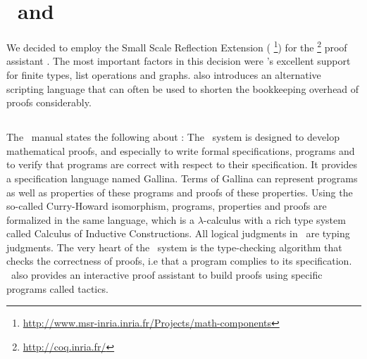 \chapter{\coq\ and \ssreflect}
\label{chap:coq}


We decided to employ the Small Scale Reflection Extension \cite{gonthier:inria-00258384} (\textbf{\ssreflect}%
\footnote{\url{http://www.msr-inria.inria.fr/Projects/math-components}})
for the \textbf{\coq}%
\footnote{\url{http://coq.inria.fr/}}
proof assistant \cite{Coq:manual}. 
The most important factors in this decision were \ssreflect's excellent support for finite types, list operations and graphs. \ssreflect{} also introduces an alternative scripting language that can often be used to shorten the bookkeeping overhead of proofs considerably.

\section{\coq}

The \coq\ manual \cite{Coq:manual} states the following about \coq:
The \coq\ system is designed to develop mathematical proofs, and especially to write formal specifications, programs and to verify that programs are correct with respect to their specification. 
It provides a specification language named Gallina. 
Terms of Gallina can represent programs as well as properties of these programs and proofs of these properties. 
Using the so-called Curry-Howard isomorphism, programs, properties and proofs are formalized in the same language, which is a $\lambda$-calculus with a rich type system 
called Calculus of Inductive Constructions. 
All logical judgments in \coq\ are typing judgments. 
The very heart of the \coq\ system is the type-checking algorithm that checks the correctness of proofs, i.e that a program complies to its specification. 
\coq\ also provides an interactive proof assistant to build proofs using specific programs called tactics.





